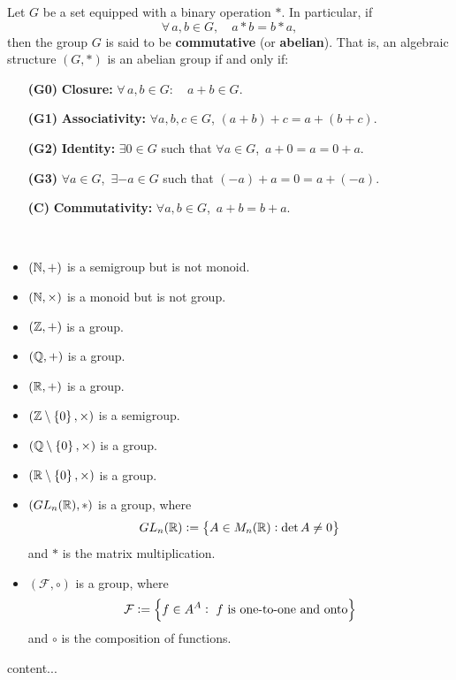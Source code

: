 \documentclass[11pt,openany]{article}
\begin{document}
\begin{remark}
Let \(G\) be a set equipped with a binary operation \(*\). In particular, if
\[
\forall\, a,b\in G,\quad a * b = b * a,
\]
then the group \(G\) is said to be \textbf{commutative} (or \textbf{abelian}). That is, an algebraic structure $(G,*)$ is an abelian group if and only if:
\begin{enumerate}[(G1)]
	\item[\textbf{(G0)}] \textbf{Closure:} $
	\forall\, a,b\in G:\quad a+b\in G.$
	\item[\textbf{(G1)}] \textbf{Associativity:} \(\forall a,b,c\in G\), $
	(a+b)+c = a+(b+c).$
	\item[\textbf{(G2)}] \textbf{Identity:} \(\exists 0\in G\) such that \(\forall a\in G\),\ $a+0 = a = 0+a.$
	\item[\textbf{(G3)}] $\forall a\in G$,\ $\exists -a\in G$ such that
	$(-a)+a = 0 = a+(-a).$
	\item[\textbf{(C)}] \textbf{Commutativity:} \(\forall a,b\in G\),\ $
	a+b = b+a.$
\end{enumerate}
\end{remark}
\begin{example}
\ \begin{itemize}
	\item $(\mathbb{N},+)$ is a semigroup but is not monoid.
	\item $(\mathbb{N},\times)$ is a monoid but is not group.
	\item $(\mathbb{Z},+)$ is a group.
	\item $(\mathbb{Q},+)$ is a group.
	\item $(\mathbb{R},+)$ is a group.
	\item $(\mathbb{Z}\setminus\set{0},\times)$ is a semigroup.
	\item $(\mathbb{Q}\setminus\set{0},\times)$ is a group.
	\item $(\mathbb{R}\setminus\set{0},\times)$ is a group.
	\item $(GL_n(\mathbb{R}),*)$ is a group, where \[
	GL_n(\mathbb{R}):=\set{A\in M_n(\mathbb{R}):\det A\neq 0}
	\] and $*$ is the matrix multiplication.
	\item $(\mathcal{F},\circ)$ is a group, where \[
	\mathcal{F}:=\set{f\in A^A:\ \text{$f$ is one-to-one and onto}}
	\] and $\circ$ is the composition of functions.
\end{itemize}
\end{example}
\begin{example}
	content...
\end{example}
\end{document}
